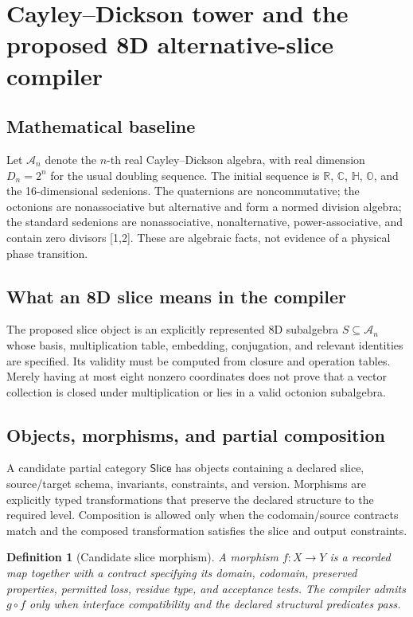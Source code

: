 \documentclass[11pt,oneside]{article}
\newtheorem{definition}{Definition}[section]
\newcommand{\CD}{\mathcal{A}}
\begin{document}
\section{Cayley--Dickson tower and the proposed 8D alternative-slice compiler}
\subsection{Mathematical baseline}
Let $\CD_n$ denote the $n$-th real Cayley--Dickson algebra, with real dimension $D_n=2^n$ for the usual doubling sequence. The initial sequence is $\mathbb{R}$, $\mathbb{C}$, $\mathbb{H}$, $\mathbb{O}$, and the 16-dimensional sedenions. The quaternions are noncommutative; the octonions are nonassociative but alternative and form a normed division algebra; the standard sedenions are nonassociative, nonalternative, power-associative, and contain zero divisors [1,2]. These are algebraic facts, not evidence of a physical phase transition.

\subsection{What an 8D slice means in the compiler}
The proposed slice object is an explicitly represented 8D subalgebra $S\subseteq \CD_n$ whose basis, multiplication table, embedding, conjugation, and relevant identities are specified. Its validity must be computed from closure and operation tables. Merely having at most eight nonzero coordinates does not prove that a vector collection is closed under multiplication or lies in a valid octonion subalgebra.

\subsection{Objects, morphisms, and partial composition}
A candidate partial category $\mathsf{Slice}$ has objects containing a declared slice, source/target schema, invariants, constraints, and version. Morphisms are explicitly typed transformations that preserve the declared structure to the required level. Composition is allowed only when the codomain/source contracts match and the composed transformation satisfies the slice and output constraints.

\begin{definition}[Candidate slice morphism]
A morphism $f:X\to Y$ is a recorded map together with a contract specifying its domain, codomain, preserved properties, permitted loss, residue type, and acceptance tests. The compiler admits $g\circ f$ only when interface compatibility and the declared structural predicates pass.
\end{definition}
\end{document}

